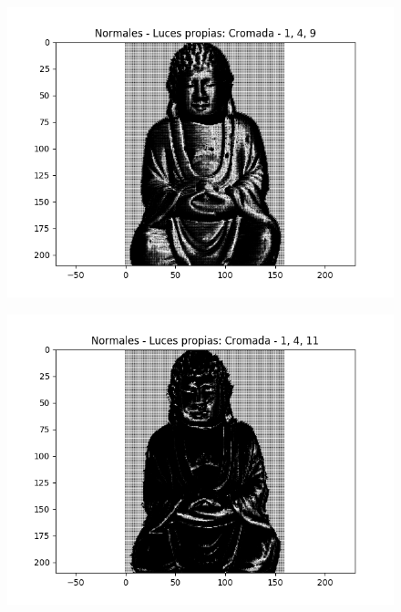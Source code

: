 \begin{figure}[H]
\centering
\begin{minipage}{.5\textwidth}
  \centering
  \includegraphics[width=1\linewidth]{informe/imagenes/normales/normalesBuda149.png}
\end{minipage}%
\begin{minipage}{.5\textwidth}
  \centering
  \includegraphics[width=1\linewidth]{informe/imagenes/normales/normalesBuda1411.png}
  \label{fig:normalesluz11}
\end{minipage}
\end{figure}

